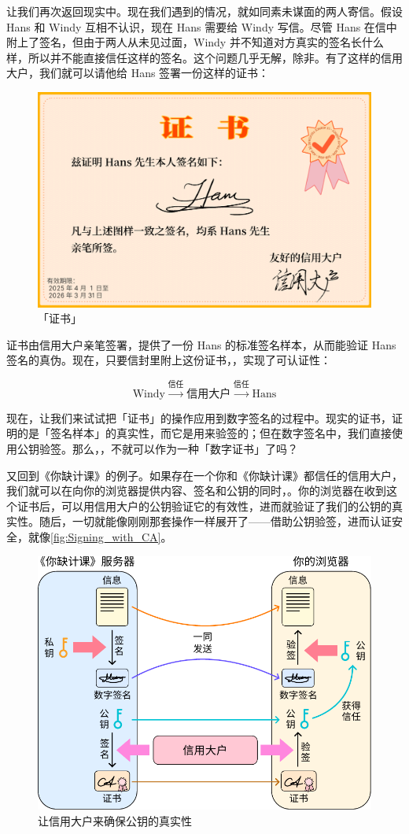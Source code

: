 让我们再次返回现实中。现在我们遇到的情况，就如同素未谋面的两人寄信。假设 Hans 和 Windy 互相不认识，现在 Hans 需要给 Windy 写信。尽管 Hans 在信中附上了签名，但由于两人从未见过面，Windy 并不知道对方真实的签名长什么样，所以并不能直接信任这样的签名。这个问题几乎无解，除非。有了这样的信用大户，我们就可以请他给 Hans 签署一份这样的证书：

\begin{figure}[htb!]
  \centering
  \includegraphics[width=.6\textwidth]{assets/surpass/Certificate.pdf}
  \caption{「证书」}
  \label{fig:Certificate}
\end{figure}

证书由信用大户亲笔签署，提供了一份 Hans 的标准签名样本，从而能验证 Hans 签名的真伪。现在，只要信封里附上这份证书，，实现了可认证性：

\[ \text{Windy} \xrightarrow{\text{信任}} \text{信用大户} \xrightarrow{\text{信任}} \text{Hans} \]

现在，让我们来试试把「证书」的操作应用到数字签名的过程中。现实的证书，证明的是「签名样本」的真实性，而它是用来验签的；但在数字签名中，我们直接使用公钥验签。那么，，不就可以作为一种「数字证书」了吗？

又回到《你缺计课》的例子。如果存在一个你和《你缺计课》都信任的信用大户，我们就可以在向你的浏览器提供内容、签名和公钥的同时，。你的浏览器在收到这个证书后，可以用信用大户的公钥验证它的有效性，进而就验证了我们的公钥的真实性。随后，一切就能像刚刚那套操作一样展开了——借助公钥验签，进而认证安全，就像\autoref{fig:Signing_with_CA}。

\begin{figure}[htb!]
  \centering
  \includegraphics[width=.7\textwidth]{assets/surpass/Signing_with_CA.pdf}
  \caption{让信用大户来确保公钥的真实性}
  \label{fig:Signing_with_CA}
\end{figure}

